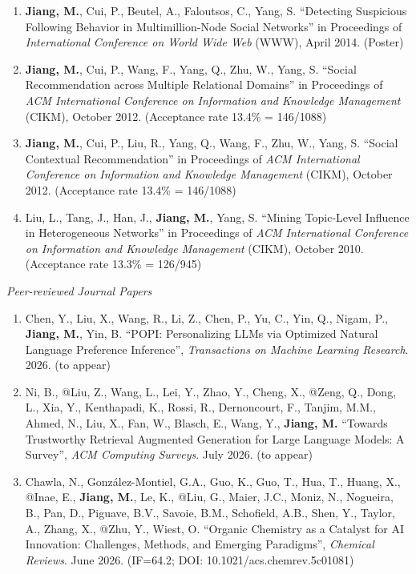 \documentclass[10pt]{article}
\newenvironment{myindentpar}[1]%
{\begin{list}{}%
         {\setlength{\leftmargin}{#1}}%
         \item[]%
}
{\end{list}}
\newcounter{list}
\begin{document}
\begin{myindentpar}{0.00cm}
\begin{enumerate}[leftmargin=.5cm]
\item[C4] \textbf{Jiang, M.}, Cui, P., Beutel, A., Faloutsos, C., Yang, S. ``Detecting Suspicious Following Behavior in Multimillion-Node Social Networks'' in Proceedings of \textit{International Conference on World Wide Web} (WWW), April 2014. (Poster)

\item[C3] \textbf{Jiang, M.}, Cui, P., Wang, F., Yang, Q., Zhu, W., Yang, S. ``Social Recommendation across Multiple Relational Domains'' in Proceedings of \textit{ACM International Conference on Information and Knowledge Management} (CIKM), October 2012. (Acceptance rate 13.4\% = 146/1088)

\item[C2] \textbf{Jiang, M.}, Cui, P., Liu, R., Yang, Q., Wang, F., Zhu, W., Yang, S. ``Social Contextual Recommendation'' in Proceedings of \textit{ACM International Conference on Information and Knowledge Management} (CIKM), October 2012. (Acceptance rate 13.4\% = 146/1088)

\item[C1] Liu, L., Tang, J., Han, J., \textbf{Jiang, M.}, Yang, S. ``Mining Topic-Level Influence in Heterogeneous Networks'' in Proceedings of \textit{ACM International Conference on Information and Knowledge Management} (CIKM), October 2010. (Acceptance rate 13.3\% = 126/945)

\end{enumerate}

\hspace{-0.25cm}\textit{Peer-reviewed Journal Papers}

\begin{enumerate}[leftmargin=.5cm]

\item[J53] Chen, Y., Liu, X., Wang, R., Li, Z., Chen, P., Yu, C., Yin, Q., Nigam, P., \textbf{Jiang, M.}, Yin, B. ``POPI: Personalizing LLMs via Optimized Natural Language Preference Inference'', \textit{Transactions on Machine Learning Research}. 2026. (to appear)

\item[J52] Ni, B., @Liu, Z., Wang, L., Lei, Y., Zhao, Y., Cheng, X., @Zeng, Q., Dong, L., Xia, Y., Kenthapadi, K., Rossi, R., Dernoncourt, F., Tanjim, M.M., Ahmed, N., Liu, X., Fan, W., Blasch, E., Wang, Y., \textbf{Jiang, M.} ``Towards Trustworthy Retrieval Augmented Generation for Large Language Models: A Survey'', \textit{ACM Computing Surveys}. July 2026. (to appear)
	
\item[J51] Chawla, N., González-Montiel, G.A., Guo, K., Guo, T., Hua, T., Huang, X., @Inae, E., \textbf{Jiang, M.}, Le, K., @Liu, G., Maier, J.C., Moniz, N., Nogueira, B., Pan, D., Piguave, B.V., Savoie, B.M., Schofield, A.B., Shen, Y., Taylor, A., Zhang, X., @Zhu, Y., Wiest, O. ``Organic Chemistry as a Catalyst for AI Innovation: Challenges, Methods, and Emerging Paradigms'', \textit{Chemical Reviews}. June 2026. (IF=64.2; DOI: 10.1021/acs.chemrev.5c01081)


\end{enumerate}
\end{myindentpar}
\end{document}
